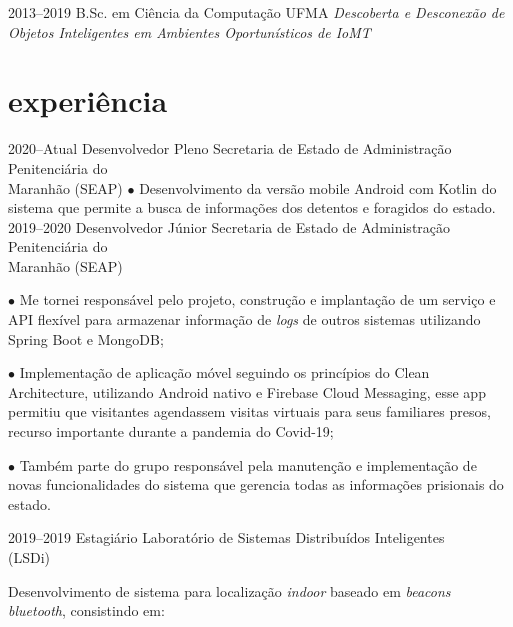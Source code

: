 \documentclass[]{../document-class/twentysecondcv}
\begin{document}
\begin{twenty}
	\twentyitem
		{2013--2019}
		{B.Sc. em Ciência da Computação}
		{UFMA}
		{\emph{Descoberta e Desconexão de Objetos Inteligentes em Ambientes Oportunísticos de IoMT}}
\end{twenty}

\section{experiência}

\begin{twenty}
	\twentyitem
		{2020--Atual} %
		{Desenvolvedor Pleno} %
		{Secretaria de Estado de Administração Penitenciária do \\\hspace*{\fill}Maranhão (SEAP)}
		{$\bullet$ Desenvolvimento da versão mobile Android com Kotlin do sistema que permite a busca de informações dos detentos e foragidos do estado.}
	\twentyitem
		{2019--2020} %
		{Desenvolvedor Júnior} %
		{Secretaria de Estado de Administração Penitenciária do \\\hspace*{\fill}Maranhão (SEAP)}
		{$\bullet$ Me tornei responsável pelo projeto, construção e implantação de um serviço e API flexível para armazenar informação de \textit{logs} de outros sistemas utilizando Spring Boot e MongoDB;\vskip 4pt

		$\bullet$  Implementação de aplicação móvel seguindo os princípios do Clean Architecture, utilizando Android nativo e Firebase Cloud Messaging, esse app permitiu que visitantes agendassem visitas virtuais para seus familiares presos, recurso importante durante a pandemia do Covid-19;\vskip 4pt

		$\bullet$ Também parte do grupo responsável pela manutenção e implementação de novas funcionalidades do sistema que gerencia todas as informações prisionais do estado.}
	
	\twentyitem
		{2019--2019}
		{Estagiário}
		{Laboratório de Sistemas Distribuídos Inteligentes \\\hspace*{\fill}(LSDi)}
		{Desenvolvimento de sistema para localização \textit{indoor} baseado em \textit{beacons bluetooth}, consistindo em:\vskip 4pt
          
}
\end{twenty}
\end{document}
